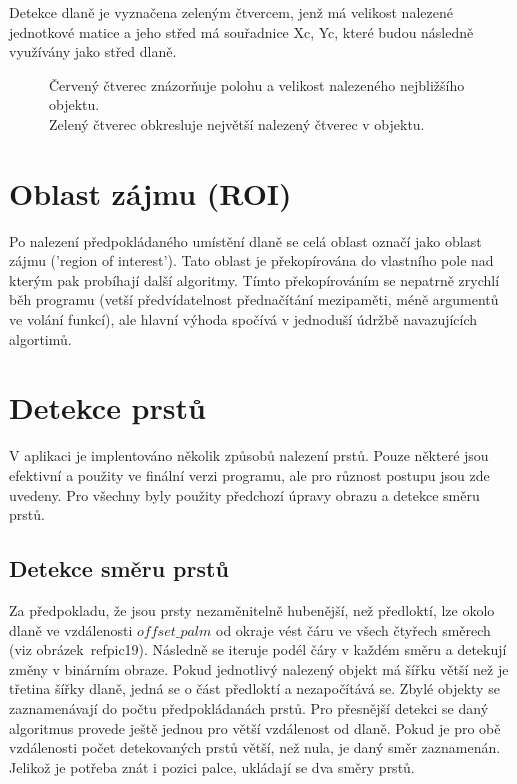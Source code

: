 Detekce dlaně je vyznačena zeleným čtvercem, jenž má velikost nalezené jednotkové matice a jeho střed má souřadnice Xc, Yc, které budou následně využívány jako střed dlaně.

\begin{figure}[htp]
\centering
{}
\caption{Červený čtverec znázorňuje polohu a velikost nalezeného nejbližšího objektu.\\
Zelený čtverec obkresluje největší nalezený čtverec v objektu.}
\label{pic18}
\end{figure}

\section{Oblast zájmu (ROI)}
Po nalezení předpokládaného umístění dlaně se celá oblast označí jako oblast zájmu ('region of interest'). Tato oblast je překopírována do vlastního pole nad kterým pak probíhají další algoritmy. Tímto překopírováním se nepatrně zrychlí běh programu (vetší předvídatelnost přednačítání mezipaměti, méně argumentů ve volání funkcí), ale hlavní výhoda spočívá v jednoduší údržbě navazujících algortimů.

\section{Detekce prstů}
V aplikaci je implentováno několik způsobů nalezení prstů. Pouze některé jsou efektivní a použity ve finální verzi programu, ale pro různost postupu jsou zde uvedeny. Pro všechny byly použity předchozí úpravy obrazu a detekce směru prstů.

\subsection{Detekce směru prstů}
Za předpokladu, že jsou prsty nezaměnitelně hubenější, než předloktí, lze okolo dlaně ve vzdálenosti $ offset\_palm $ od okraje vést čáru ve všech čtyřech směrech (viz obrázek~ref{pic19}). Následně se iteruje podél čáry v každém směru a detekují změny v binárním obraze. Pokud jednotlivý nalezený objekt má šířku větší než je třetina šířky dlaně, jedná se o část předloktí a nezapočítává se. Zbylé objekty se zaznamenávají do počtu předpokládanách prstů.  Pro přesnější detekci se daný algoritmus provede ještě jednou pro větší vzdálenost od dlaně. Pokud je pro obě vzdálenosti počet detekovaných prstů větší, než nula, je daný směr zaznamenán. Jelikož je potřeba znát i pozici palce, ukládají se dva směry prstů.


